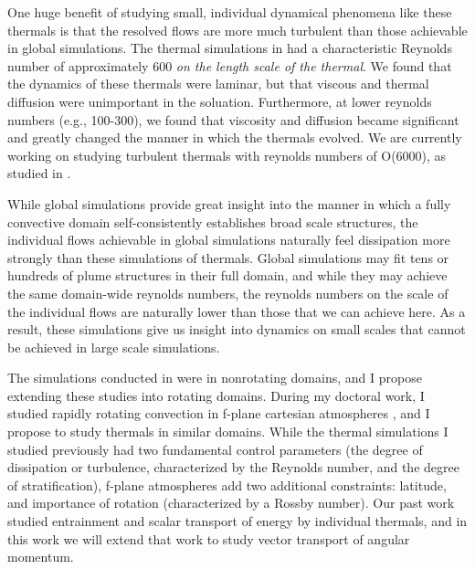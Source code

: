 \documentclass[aasms,12pt]{article}
\begin{document}
One huge benefit of studying small, individual dynamical phenomena like these thermals is that the resolved flows are more much turbulent than those achievable in global simulations.
The thermal simulations in \citet{andersLB2019} had a characteristic Reynolds number of approximately 600 \emph{on the length scale of the thermal}.
We found that the dynamics of these thermals were laminar, but that viscous and thermal diffusion were unimportant in the soluation.
Furthermore, at lower reynolds numbers (e.g., 100-300), we found that viscosity and diffusion became significant and greatly changed the manner in which the thermals evolved.
We are currently working on studying turbulent thermals with reynolds numbers of O(6000), as studied in \citet{lecoanet&jeevanjee2019}.

While global simulations provide great insight into the manner in which a fully convective domain self-consistently establishes broad scale structures, the individual flows achievable in global simulations naturally feel dissipation more strongly than these simulations of thermals. 
Global simulations may fit tens or hundreds of plume structures in their full domain, and while they may achieve the same domain-wide reynolds numbers, the reynolds numbers on the scale of the individual flows are naturally lower than those that we can achieve here.
As a result, these simulations give us insight into dynamics on small scales that cannot be achieved in large scale simulations.

The simulations conducted in \citet{andersLB2019} were in nonrotating domains, and I propose extending these studies into rotating domains.
During my doctoral work, I studied rapidly rotating convection in f-plane cartesian atmospheres \citep{anders&all2019}, and I propose to study thermals in similar domains.
While the thermal simulations I studied previously had two fundamental control parameters (the degree of dissipation or turbulence, characterized by the Reynolds number, and the degree of stratification), f-plane atmospheres add two additional constraints: latitude, and importance of rotation (characterized by a Rossby number).
Our past work studied entrainment and scalar transport of energy by individual thermals, and in this work we will extend that work to study vector transport of angular momentum.
\end{document}
